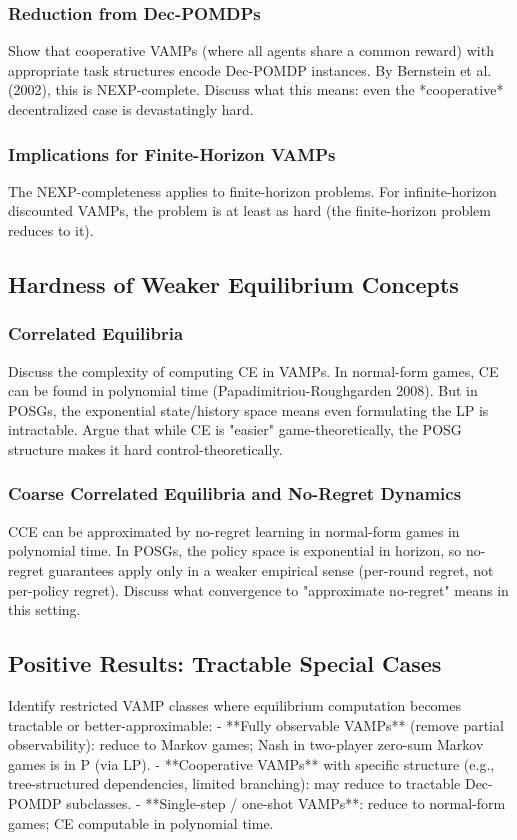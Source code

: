 \subsubsection{Reduction from Dec-POMDPs}
Show that cooperative VAMPs (where all agents share a common reward) with appropriate task structures encode Dec-POMDP instances. By Bernstein et al. (2002), this is NEXP-complete. Discuss what this means: even the *cooperative* decentralized case is devastatingly hard.

\subsubsection{Implications for Finite-Horizon VAMPs}
The NEXP-completeness applies to finite-horizon problems. For infinite-horizon discounted VAMPs, the problem is at least as hard (the finite-horizon problem reduces to it).

\subsection{Hardness of Weaker Equilibrium Concepts}

\subsubsection{Correlated Equilibria}
Discuss the complexity of computing CE in VAMPs. In normal-form games, CE can be found in polynomial time (Papadimitriou-Roughgarden 2008). But in POSGs, the exponential state/history space means even formulating the LP is intractable. Argue that while CE is "easier" game-theoretically, the POSG structure makes it hard control-theoretically.

\subsubsection{Coarse Correlated Equilibria and No-Regret Dynamics}
CCE can be approximated by no-regret learning in normal-form games in polynomial time. In POSGs, the policy space is exponential in horizon, so no-regret guarantees apply only in a weaker empirical sense (per-round regret, not per-policy regret). Discuss what convergence to "approximate no-regret" means in this setting.

\subsection{Positive Results: Tractable Special Cases}
Identify restricted VAMP classes where equilibrium computation becomes tractable or better-approximable:
- **Fully observable VAMPs** (remove partial observability): reduce to Markov games; Nash in two-player zero-sum Markov games is in P (via LP).
- **Cooperative VAMPs** with specific structure (e.g., tree-structured dependencies, limited branching): may reduce to tractable Dec-POMDP subclasses.
- **Single-step / one-shot VAMPs**: reduce to normal-form games; CE computable in polynomial time.

